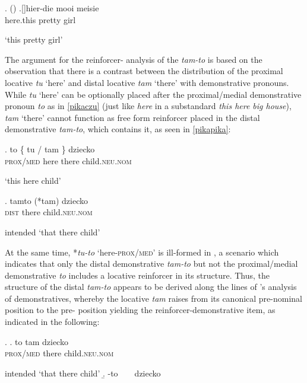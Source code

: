 \ex.  (\citealt[226--227]{Roehrs2010})
\ag.[]\hspace{-22pt}hier-die mooi meisie\\
\hspace{-22pt}here.this pretty girl\\
\hspace{-22pt}\strut `this pretty girl'

The argument for the reinforcer- analysis of the  \textit{tam-to} is based on the observation that there is a contrast between the distribution of the  proximal locative \textit{tu} `here' and distal locative \textit{tam} `there' with demonstrative pronouns. While \textit{tu} `here' can be optionally placed after the  proximal/medial demonstrative pronoun \textit{to} as in \ref{pikaczu}  (just like \textit{here} in a substandard  \textit{this here big house}), \textit{tam} `there' cannot function as free form reinforcer placed in the distal demonstrative \textit{tam-to}, which contains it, as seen in \ref{pikapika}:

\exg. to \{ tu / {tam \}} dziecko\\
\textsc{prox/med} {} here {} there child.\textsc{neu.nom}\\
\strut `this here child'\label{pikaczu}

\exg. tamto (*tam) dziecko\\
\textsc{dist} \phantom{cl}there child.\textsc{neu.nom}\\
\strut intended `that there child'\label{pikapika}

At the same time, *\textit{tu-to} `here-\textsc{prox/med}' is ill-formed in , a scenario which indicates that only the distal demonstrative \textit{tam-to} but not the proximal/medial demonstrative \textit{to} includes a locative reinforcer in its structure. Thus, the structure of the distal \textit{tam-to} appears to be derived along the lines of \citeauthor{Leu2007}'s \citeyearpar{Leu2007} analysis of  demonstratives, whereby the locative \textit{tam} raises from its canonical pre-nominal position to the pre- position yielding the reinforcer-demonstrative item, as indicated in the following:
 
 \ex.
 \ag. to tam dziecko \\
\textsc{prox/med} there child.\textsc{neu.nom}\\
\strut intended `that there child'
\newlength{\arrowht}
\setlength{\arrowht}{2ex}
\newcommand*\cgdepthstrut{{\vrule height 0pt depth \arrowht width 0pt}}
\renewcommand\eachwordone{\cgdepthstrut\rmfamily}
\renewcommand\glt{\vskip -\topsep}
\let\trans=\glt
\newcommand\arrowex{\setlength{\arrowht}{1ex}\ex}
\b. -to {\ }  {\ } dziecko  

